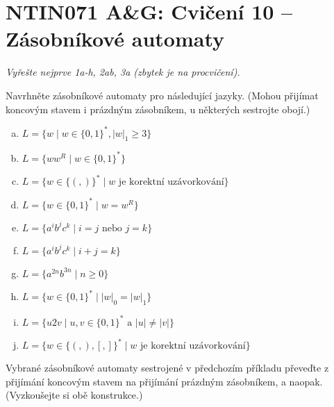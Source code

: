 \documentclass[a4paper,12pt]{amsart}
\begin{document}
\thispagestyle{empty}

\section*{NTIN071 A\&G: Cvičení 10 -- Zásobníkové automaty}


\medskip

\noindent\emph{Vyřešte nejprve 1a-h, 2ab, 3a (zbytek je na procvičení).}

\medskip


\medskip\begin{problem}

    Navrhněte zásobníkové automaty pro následující jazyky. (Mohou přijímat koncovým stavem i prázdným zásobníkem, u některých sestrojte obojí.)

    \bigskip

    \begin{enumerate}[(a)]\setlength\itemsep{12pt}
        \item $L=\{w\mid w\in\{0,1\}^*,|w|_1\geq 3\}$
        \item $L=\{ww^R\mid w\in \{0,1\}^*\}$
        \item $L=\{w\in\{(,)\}^*\mid w\text{ je korektní uzávorkování}\}$
        \item $L=\{w\in \{0,1\}^*\mid w=w^R\}$
        \item $L=\{a^ib^jc^k\mid i=j \text{ nebo } j=k\} $
        \item $L=\{a^ib^jc^k\mid i+j=k\}$
        \item $L=\{a^{2n}b^{3n}\mid n\geq 0\}$
        \item $L=\{w\in \{0,1\}^*\mid  |w|_0=|w|_1\} $
        \item $L=\{u2v\mid u,v\in \{0,1\}^*\text{ a }|u|\neq |v|\} $
        \item $L=\{w\in\{(,),[,]\}^*\mid w\text{ je korektní uzávorkování}\}$   
    \end{enumerate}

\end{problem}


\medskip\begin{problem}

    Vybrané zásobníkové automaty sestrojené v předchozím příkladu převeďte z přijímání koncovým stavem na přijímání prázdným zásobníkem, a naopak. (Vyzkoušejte si obě konstrukce.)

\end{problem}
\end{document}
